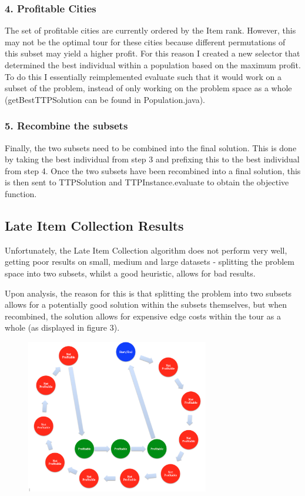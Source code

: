 \documentclass[a4paper,12pt]{article}
\begin{document}
\subsubsection*{4. Profitable Cities}
The set of profitable cities are currently ordered by the Item rank. However, this may not be the optimal tour for these cities because different permutations of this subset may yield a higher profit. For this reason I created a new selector that determined the best individual within a population based on the maximum profit. To do this I essentially reimplemented evaluate such that it would work on a subset of the problem, instead of only working on the problem space as a whole (getBestTTPSolution can be found in Population.java).

\subsubsection*{5. Recombine the subsets}
Finally, the two subsets need to be combined into the final solution. This is done by taking the best individual from step 3 and prefixing this to the best individual from step 4. Once the two subsets have been recombined into a final solution, this is then sent to TTPSolution and TTPInstance.evaluate to obtain the objective function.


\subsection*{Late Item Collection Results}
Unfortunately, the Late Item Collection algorithm does not perform very well, getting poor results on small, medium and large datasets - splitting the problem space into two subsets, whilst a good heuristic, allows for bad results.

Upon analysis, the reason for this is that splitting the problem into two subsets allows for a potentially good solution within the subsets themselves, but when recombined, the solution allows for expensive edge costs within the tour as a whole (as displayed in figure 3).
\begin{figure}[h]
\centering
\includegraphics[width=80mm]{TheIssue.png}
\end{figure}
\end{document}
